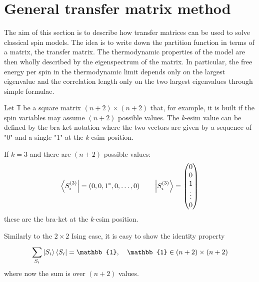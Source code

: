 \documentclass[../../Main/Main.tex]{subfiles}
\begin{document}
\section{General transfer matrix method}
The aim of this section is to describe how transfer matrices can be used to solve classical spin models. The idea is to write down the partition function in terms of a matrix, the transfer matrix. The thermodynamic properties of the model are then wholly described by the eigenspectrum of the matrix. In particular, the free energy per spin in the thermodynamic limit depends only on the largest eigenvalue and the correlation length only on the two largest eigenvalues through simple formulae.

Let \( \mathbb{T} \) be a square matrix \( (n+2) \times (n+2) \) that, for example, it is built if the spin variables may assume \( (n+2) \) possible values. The \emph{k}-esim value can be defined by the bra-ket notation where the two vectors are given by a sequence of "0" and a single "1" at the \emph{k}-esim  position.
\begin{example}{}{}
If \( k=3 \) and there are \( (n+2) \)  possible values:
  \begin{equation*}
    \bra{S_i^{(3)}} = (0,0,1^*,0,\dots,0) \qquad   \ket{S_i^{(3)}} = \begin{pmatrix}
      0 \\
      0 \\
      1 \\
      \vdots \\
      0
      \end{pmatrix}
  \end{equation*}
these are the bra-ket at the \emph{k}-esim position.
\end{example}
Similarly to the \( 2 \times 2 \) Ising case, it is easy to show the identity property
\begin{equation}
  \sum_{S_i}^{} \ket{S_i} \bra{S_i} = \mathbb{1}, \quad \mathbb{1} \in (n+2)\times(n+2)
\end{equation}
where now the sum is over \( (n+2) \) values.
\end{document}
